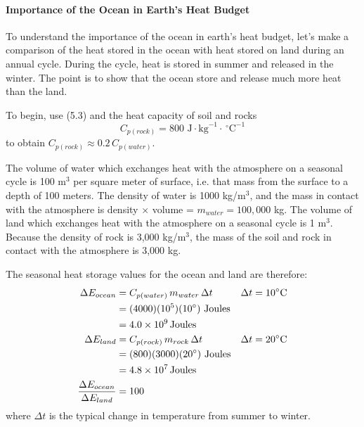 \paragraph{Importance of the Ocean in Earth's Heat Budget}
To understand the importance of the
ocean in earth's heat budget, let's make a comparison of the heat
stored in the ocean with heat stored on land during an annual
cycle. During the cycle, heat is stored in summer and released in the
winter. The point is to show that the ocean store and release much
more heat than the land.

To begin, use (5.3) and the heat capacity of soil and rocks
\begin{equation}
C_{p(rock)} = 800 \mbox{ J}\cdot \mbox{kg}^{-1} \cdot \, ^\circ \mbox{C}^{-1}
\end{equation}
to obtain $C_{p(rock)} \approx 0.2 \, C_{p(water)}$.

The volume of water which exchanges heat with the atmosphere on a
seasonal cycle is 100 m$^3$ per square meter of surface, i.e. that
mass from the surface to a depth of 100 meters. The density of water
is 1000 kg/m$^3$, and the mass in contact with the atmosphere is
density $\times$ volume = $m_{water} = 100,000$ kg. The volume of land
which exchanges heat with the atmosphere on a seasonal cycle is 1
m$^3$. Because the density of rock is 3,000 kg/m$^3$, the mass of the
soil and rock in contact with the atmosphere is 3,000 kg.

The seasonal heat storage values for the
ocean and land are therefore:
\begin{align}
\Delta E_{ocean} & = C_{p(water)} \, m_{water}\, \Delta t && \Delta t =
10^{\circ} \text{C} \notag \\
                                     & = (4000) (10^5) (10^{\circ}) \text{
Joules}       \notag  \\
                                     & = 4.0 \times 10^9 \, \text{Joules}                 \notag  \\
\Delta E_{land}   & = C_{p(rock)} \, m_{rock}\, \Delta t & & \Delta t = 20^{\circ
} \text{C} \notag \\
                                     & = (800) (3000) (20^{\circ}) \text{
Joules}        \notag  \\
                                     & = 4.8 \times 10^7 \, \text{Joules}               \notag  \\
\frac{\Delta E_{ocean}}{\Delta E_{land}}  & = 100 \notag
\end{align}
where $\Delta t$ is the typical change in temperature from summer to
winter.

